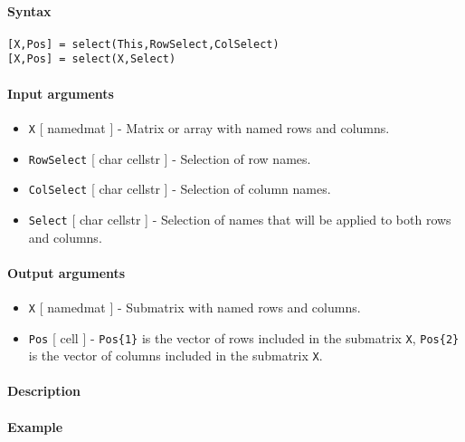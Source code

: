 


	\paragraph{Syntax}

\begin{verbatim}
[X,Pos] = select(This,RowSelect,ColSelect)
[X,Pos] = select(X,Select)
\end{verbatim}

\paragraph{Input arguments}

\begin{itemize}
\item
  \texttt{X} {[} namedmat {]} - Matrix or array with named rows and
  columns.
\item
  \texttt{RowSelect} {[} char \textbar{} cellstr {]} - Selection of row
  names.
\item
  \texttt{ColSelect} {[} char \textbar{} cellstr {]} - Selection of
  column names.
\item
  \texttt{Select} {[} char \textbar{} cellstr {]} - Selection of names
  that will be applied to both rows and columns.
\end{itemize}

\paragraph{Output arguments}

\begin{itemize}
\item
  \texttt{X} {[} namedmat {]} - Submatrix with named rows and columns.
\item
  \texttt{Pos} {[} cell {]} - \texttt{Pos\{1\}} is the vector of rows
  included in the submatrix \texttt{X}, \texttt{Pos\{2\}} is the vector
  of columns included in the submatrix \texttt{X}.
\end{itemize}

\paragraph{Description}

\paragraph{Example}


